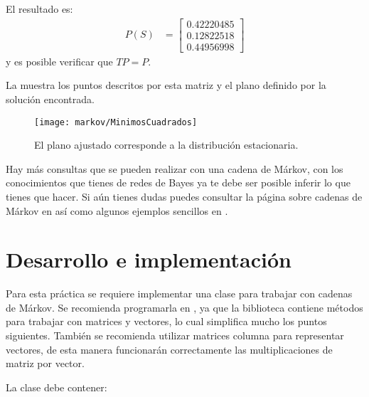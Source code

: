 El resultado es:
\begin{align*}
 P(S) &= \begin{bmatrix}
  0.42220485 \\
  0.12822518 \\
  0.44956998
 \end{bmatrix}
\end{align*}
y es posible verificar que $TP = P$.

La  muestra los puntos descritos por esta matriz y el plano definido por la solución encontrada.

\begin{figure}
 \centering
 \texttt{[image: markov/MinimosCuadrados]}
 \caption{El plano ajustado corresponde a la distribución estacionaria.}\label{fig:MinimosCuadrados}
\end{figure}


Hay más consultas que se pueden realizar con una cadena de Márkov, con los conocimientos que tienes de redes de Bayes ya te debe ser posible inferir lo que tienes que hacer.  Si aún tienes dudas puedes consultar la página sobre cadenas de Márkov en  así como algunos ejemplos sencillos en .



\section{Desarrollo e implementación}

Para esta práctica se requiere implementar una clase para trabajar con cadenas de Márkov.  Se recomienda programarla en , ya que la biblioteca  contiene métodos para trabajar con matrices y vectores, lo cual simplifica mucho los puntos siguientes.  También se recomienda utilizar matrices columna para representar vectores, de esta manera funcionarán correctamente las multiplicaciones de matriz por vector.

La clase  debe contener:

